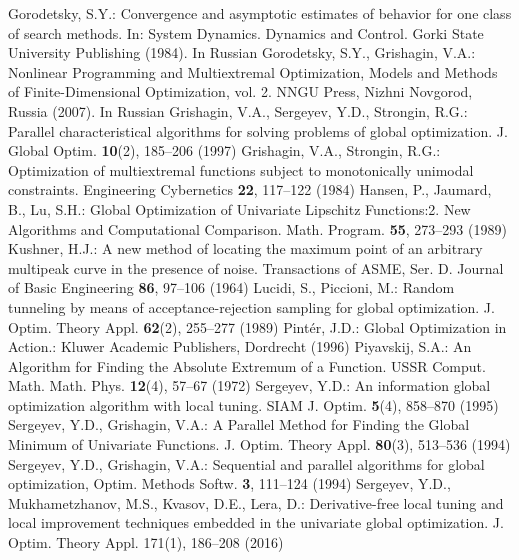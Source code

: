 \begin{thebibliography}{99.}
 Gorodetsky, S.Y.: Convergence and asymptotic estimates of behavior for one class of search methods. In: System Dynamics. Dynamics and Control. Gorki State University Publishing (1984). In Russian 
 Gorodetsky, S.Y., Grishagin, V.A.: Nonlinear Programming and Multiextremal Optimization, Models and Methods of Finite-Dimensional Optimization, vol. 2. NNGU Press, Nizhni Novgorod, Russia (2007). In Russian
 Grishagin, V.A., Sergeyev, Y.D., Strongin, R.G.: Parallel characteristical algorithms for solving problems of global optimization. J. Global Optim. \textbf{10}(2), 185–206 (1997)
 Grishagin, V.A., Strongin, R.G.: Optimization of multiextremal functions subject to monotonically unimodal constraints. Engineering Cybernetics \textbf{22},  117--122 (1984)
 Hansen, P., Jaumard, B., Lu, S.H.: Global Optimization of Univariate Lipschitz Functions:2. New Algorithms and Computational Comparison. Math. Program. \textbf{55}, 273--293 (1989)
	Kushner, H.J.: A new method of locating the maximum point of an arbitrary multipeak curve in the presence of noise. Transactions of ASME, Ser. D. Journal of Basic Engineering \textbf{86}, 97--106 (1964)
 Lucidi, S., Piccioni, M.:  Random tunneling by means of acceptance-rejection sampling for global optimization. J. Optim. Theory Appl. \textbf{62}(2), 255--277 (1989)
	Pint{\'e}r, J.D.: Global Optimization in Action.: Kluwer Academic Publishers, Dordrecht (1996)
	Piyavskij, S.A.: An Algorithm for Finding the Absolute Extremum of a Function. USSR Comput. Math. Math. Phys. \textbf{12}(4), 57--67 (1972)
 Sergeyev, Y.D.: An information global optimization algorithm with local tuning. SIAM J. Optim. \textbf{5}(4), 858–870 (1995)
 Sergeyev, Y.D., Grishagin, V.A.: A Parallel Method for Finding the Global Minimum of Univariate Functions. J. Optim. Theory Appl. \textbf{80}(3), 513--536 (1994)
 Sergeyev, Y.D., Grishagin, V.A.: Sequential and parallel algorithms for global optimization, Optim. Methods Softw. \textbf{3},  111--124 (1994)
 Sergeyev, Y.D., Mukhametzhanov, M.S., Kvasov, D.E., Lera, D.: Derivative-free local tuning and local improvement techniques embedded in the univariate global optimization. J. Optim. Theory Appl. 171(1), 186–208 (2016)

\end{thebibliography}
